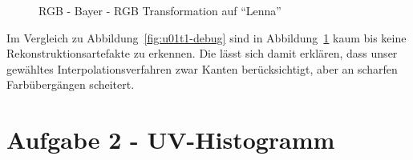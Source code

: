 \begin{figure}[htpb]
\begin{center}
\end{center}
\caption{RGB - Bayer - RGB Transformation auf ``Lenna''}
\label{fig:u01t1-lenna}
\end{figure}

Im Vergleich zu Abbildung~\ref{fig:u01t1-debug} sind in Abbildung~\ref{fig:u01t1-lenna} 
kaum bis keine Rekonstruktionsartefakte zu erkennen. Die l\"asst sich damit erkl\"aren,
dass unser gew\"ahltes Interpolationsverfahren zwar Kanten ber\"ucksichtigt, aber an
scharfen Farb\"uberg\"angen scheitert.

\section*{Aufgabe 2 - UV-Histogramm} 



